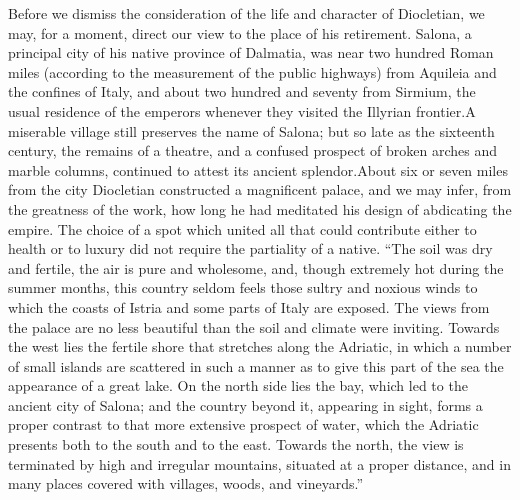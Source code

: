 



Before we dismiss the consideration of the life and character of
Diocletian, we may, for a moment, direct our view to the place of
his retirement. Salona, a principal city of his native province
of Dalmatia, was near two hundred Roman miles (according to the
measurement of the public highways) from Aquileia and the
confines of Italy, and about two hundred and seventy from
Sirmium, the usual residence of the emperors whenever they
visited the Illyrian frontier.\footnotemark[115] A miserable village still
preserves the name of Salona; but so late as the sixteenth
century, the remains of a theatre, and a confused prospect of
broken arches and marble columns, continued to attest its ancient
splendor.\footnotemark[116] About six or seven miles from the city Diocletian
constructed a magnificent palace, and we may infer, from the
greatness of the work, how long he had meditated his design of
abdicating the empire. The choice of a spot which united all that
could contribute either to health or to luxury did not require
the partiality of a native. “The soil was dry and fertile, the
air is pure and wholesome, and, though extremely hot during the
summer months, this country seldom feels those sultry and noxious
winds to which the coasts of Istria and some parts of Italy are
exposed. The views from the palace are no less beautiful than the
soil and climate were inviting. Towards the west lies the fertile
shore that stretches along the Adriatic, in which a number of
small islands are scattered in such a manner as to give this part
of the sea the appearance of a great lake. On the north side lies
the bay, which led to the ancient city of Salona; and the country
beyond it, appearing in sight, forms a proper contrast to that
more extensive prospect of water, which the Adriatic presents
both to the south and to the east. Towards the north, the view is
terminated by high and irregular mountains, situated at a proper
distance, and in many places covered with villages, woods, and
vineyards.”\footnotemark[117]

